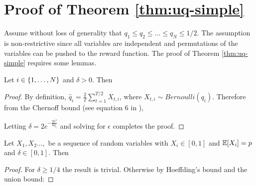 

\section{Proof of Theorem \ref{thm:uq-simple}}\label{sec:thm:uq-simple}


Assume without loss of generality that $q_1 \leq q_2 \leq \ldots \leq q_N \leq 1/2$. The assumption is non-restrictive since all variables
are independent and permutations of the variables can be pushed to the reward function.
The proof of Theorem \ref{thm:uq-simple} requires some lemmas. \

\begin{lemma}\label{lem:conc1}
Let $i \in \left\{1,\ldots, N\right\}$ and $\delta > 0$. Then
\end{lemma}

\begin{proof}
By definition, $\hat{q}_i = \frac{2}{T}\sum_{t=1}^{T/2}X_{t,i}$, where $X_{t,i} \sim Bernoulli(q_i)$. Therefore from the Chernoff bound (see equation 6 in \cite{hagerup1990guided}),


Letting $\delta = 2e^{-\frac{T\epsilon^2}{6q_i}}$ and solving for $\epsilon$ completes the proof.

\end{proof}

\begin{lemma}\label{lem:conc2}
Let $X_1,X_2\ldots,$ be a sequence of random variables with $X_i \in [0,1]$ and $\mathbb E[X_i] = p$ and $\delta \in [0,1]$.
Then 
\end{lemma}

\begin{proof}
For $\delta \geq 1/4$ the result is trivial. Otherwise 
by Hoeffding's bound and the union bound:
\end{proof}




